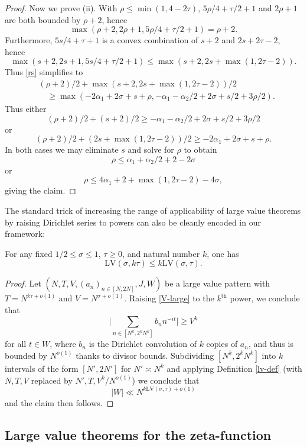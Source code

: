 \documentclass[a4paper, 10pt]{amsart}
\newcommand{\LV}{\mathrm{LV}}
\begin{document}
\begin{proof}
    Now we prove (ii).  With $\rho \leq \min(1,4-2\tau)$, $5\rho/4+\tau/2+1$ and $2\rho+1$ are both bounded by $\rho+2$, hence
    $$ \max(\rho+2, 2\rho+1, 5\rho/4 + \tau/2 + 1) = \rho+2.$$
    Furthermore, $5s/4+\tau+1$ is a convex combination of $s+2$ and $2s + 2\tau-2$, hence
    $$\max(s+2, 2s+1, 5s/4 + \tau/2 + 1) \leq \max(s+2, 2s + \max(1,2\tau-2)).$$
    Thus \eqref{rs} simplifies to
    \begin{align*}
        &(\rho+2)/2 + \max(s+2, 2s+\max(1,2\tau-2))/2 \\
        &\quad \geq
        \max( -2\alpha_1 + 2\sigma + s + \rho, -\alpha_1 - \alpha_2/2 + 2\sigma + s/2 + 3\rho/2).
    \end{align*}
    Thus either
    $$(\rho+2)/2 + (s+2)/2 \geq -\alpha_1 - \alpha_2/2 + 2\sigma + s/2 + 3\rho/2$$
    or
    $$(\rho+2)/2 + (2s+\max(1,2\tau-2))/2 \geq  -2\alpha_1 + 2\sigma + s + \rho.$$
    In both cases we may eliminate $s$ and solve for $\rho$ to obtain
    $$ \rho \leq \alpha_1 + \alpha_2/2 + 2 - 2 \sigma $$
    or
    $$ \rho \leq 4\alpha_1 + 2 + \max(1,2\tau-2) - 4 \sigma,$$
    giving the claim.
    \end{proof}


The standard trick of increasing the range of applicability of large value theorems by raising Dirichlet series to powers can also be cleanly encoded in our framework:

\begin{lemma}\label{power-lemma} For any fixed $1/2 \leq \sigma \leq 1$, $\tau \geq 0$, and natural number $k$, one has
    $$ \LV(\sigma, k\tau) \leq k \LV(\sigma, \tau).$$
\end{lemma}

\begin{proof} Let  $(N,T,V,(a_n)_{n \in [N,2N]},J,W)$ be a large value pattern with $T = N^{k\tau+o(1)}$ and $V = N^{\sigma+o(1)}$. Raising \eqref{V-large} to the $k^{\mathrm{th}}$ power, we conclude that
$$ \bigg|\sum_{n \in [N^k,2^kN^k]} b_n n^{-it} \bigg| \geq V^k$$
for all $t \in W$, where $b_n$ is the Dirichlet convolution of $k$ copies of $a_n$, and thus is bounded by $N^{o(1)}$ thanks to divisor bounds.  Subdividing $[N^k, 2^k N^k]$ into $k$ intervals of the form $[N',2N']$ for $N' \asymp N^k$ and applying Definition \ref{lv-def} (with $N, T, V$ replaced by $N', T, V^k/N^{o(1)}$) we conclude that
$$ |W| \ll N^{k \LV(\sigma,\tau) + o(1)}$$
and the claim then follows.
\end{proof}

\subsection{Large value theorems for the zeta-function}
\end{document}
